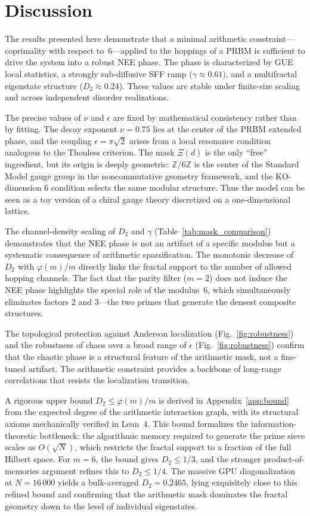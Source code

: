 \documentclass[11pt,a4paper]{article}
\begin{document}
\section{Discussion}
\label{sec:discussion}

The results presented here demonstrate that a minimal arithmetic constraint---coprimality with respect to~6---applied to the hoppings of a PRBM is sufficient to drive the system into a robust NEE phase. The phase is characterized by GUE local statistics, a strongly sub-diffusive SFF ramp ($\gamma\approx0.61$), and a multifractal eigenstate structure ($D_2\approx0.24$). These values are stable under finite-size scaling and across independent disorder realizations.

The precise values of $\nu$ and $\epsilon$ are fixed by mathematical consistency rather than by fitting. The decay exponent $\nu=0.75$ lies at the center of the PRBM extended phase, and the coupling $\epsilon=\pi\sqrt{2}$ arises from a local resonance condition analogous to the Thouless criterion. The mask $\Xi(d)$ is the only ``free'' ingredient, but its origin is deeply geometric: $\mathbb{Z}/6\mathbb{Z}$ is the center of the Standard Model gauge group in the noncommutative geometry framework, and the KO-dimension 6 condition selects the same modular structure. Thus the model can be seen as a toy version of a chiral gauge theory discretized on a one-dimensional lattice.

The channel-density scaling of $D_2$ and $\gamma$ (Table~\ref{tab:mask_comparison}) demonstrates that the NEE phase is not an artifact of a specific modulus but a systematic consequence of arithmetic sparsification. The monotonic decrease of $D_2$ with $\varphi(m)/m$ directly links the fractal support to the number of allowed hopping channels. The fact that the parity filter ($m=2$) does not induce the NEE phase highlights the special role of the modulus~6, which simultaneously eliminates factors 2 and 3---the two primes that generate the densest composite structures.

The topological protection against Anderson localization (Fig.~\ref{fig:robustness}) and the robustness of chaos over a broad range of $\epsilon$ (Fig.~\ref{fig:robustness}) confirm that the chaotic phase is a structural feature of the arithmetic mask, not a fine-tuned artifact. The arithmetic constraint provides a backbone of long-range correlations that resists the localization transition.

A rigorous upper bound $D_2 \le \varphi(m)/m$ is derived in Appendix~\ref{app:bound} from the expected degree of the arithmetic interaction graph, with its structural axioms mechanically verified in Lean~4. This bound formalizes the information-theoretic bottleneck: the algorithmic memory required to generate the prime sieve scales as $O(\sqrt{N})$, which restricts the fractal support to a fraction of the full Hilbert space. For $m=6$, the bound gives $D_2 \le 1/3$, and the stronger product-of-memories argument refines this to $D_2 \le 1/4$. The massive GPU diagonalization at $N=16\,000$ yields a bulk-averaged $D_2 = 0.2465$, lying exquisitely close to this refined bound and confirming that the arithmetic mask dominates the fractal geometry down to the level of individual eigenstates.
\end{document}
